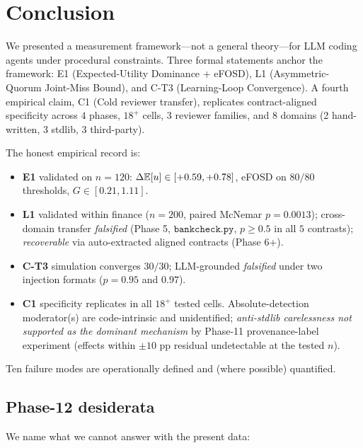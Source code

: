 \section{Conclusion}
\label{sec:conclusion}

We presented a measurement framework---not a general theory---for LLM coding agents under procedural constraints. Three formal statements anchor the framework: E1 (Expected-Utility Dominance + eFOSD), L1 (Asymmetric-Quorum Joint-Miss Bound), and C-T3 (Learning-Loop Convergence). A fourth empirical claim, C1 (Cold reviewer transfer), replicates contract-aligned specificity across $4$ phases, $18^+$ cells, $3$ reviewer families, and $8$ domains (2 hand-written, 3 stdlib, 3 third-party).

The honest empirical record is:

\begin{itemize}[leftmargin=2em]
\item \textbf{E1} validated on $n=120$: $\Delta\mathbb{E}[u] \in [+0.59, +0.78]$, eFOSD on $80/80$ thresholds, $G \in [0.21, 1.11]$.
\item \textbf{L1} validated within finance ($n=200$, paired McNemar $p = 0.0013$); cross-domain transfer \emph{falsified} (Phase 5, $\texttt{bankcheck.py}$, $p \ge 0.5$ in all $5$ contrasts); \emph{recoverable} via auto-extracted aligned contracts (Phase 6+).
\item \textbf{C-T3} simulation converges $30/30$; LLM-grounded \emph{falsified} under two injection formats ($p = 0.95$ and $0.97$).
\item \textbf{C1} specificity replicates in all $18^+$ tested cells. Absolute-detection moderator(s) are code-intrinsic and unidentified; \emph{anti-stdlib carelessness not supported as the dominant mechanism} by Phase-11 provenance-label experiment (effects within $\pm 10$ pp residual undetectable at the tested $n$).
\end{itemize}

Ten failure modes are operationally defined and (where possible) quantified.

\subsection{Phase-12 desiderata}

We name what we cannot answer with the present data:

